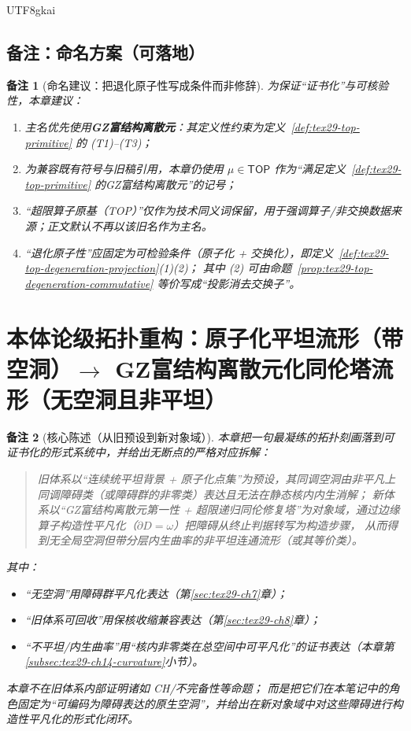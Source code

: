 \documentclass[12pt]{article}
\newtheorem{remark}{备注}[section]
\newcommand{\GZMonFull}{\texorpdfstring{GZ富结构离散元}{GZ富结构离散元}}
\newcommand{\GZMon}{\texorpdfstring{GZ富结构离散元}{GZ富结构离散元}}
\newcommand{\GZMonization}{\texorpdfstring{GZ富结构离散元化}{GZ富结构离散元化}}
\begin{document}
\begin{CJK*}{UTF8}{gkai}
\subsection{备注：命名方案（可落地）}
\label{subsec:tex29-top-remark}

\begin{remark}[命名建议：把退化原子性写成条件而非修辞]
为保证“证书化”与可核验性，本章建议：
\begin{enumerate}
  \item 主名优先使用\textbf{\GZMonFull{}}：其定义性约束为定义~\ref{def:tex29-top-primitive} 的 (T1)--(T3)；
  \item 为兼容既有符号与旧稿引用，本章仍使用 $\mu\in\mathsf{TOP}$ 作为“满足定义~\ref{def:tex29-top-primitive} 的\GZMon{}”的记号；
  \item “超限算子原基（TOP）”仅作为技术同义词保留，用于强调算子/非交换数据来源；正文默认不再以该旧名作为主名。
  \item “退化原子性”应固定为可检验条件（原子化 + 交换化），即定义~\ref{def:tex29-top-degeneration-projection}(1)(2)；
  其中 (2) 可由命题~\ref{prop:tex29-top-degeneration-commutative} 等价写成“投影消去交换子”。
\end{enumerate}
\end{remark}

\clearpage

\section{本体论级拓扑重构：原子化平坦流形（带空洞）\texorpdfstring{$\to$}{->} \GZMonization{}同伦塔流形（无空洞且非平坦）}
\label{sec:tex29-ch14}

\begin{remark}[核心陈述（从旧预设到新对象域）]
本章把一句最凝练的拓扑刻画落到可证书化的形式系统中，并给出无断点的严格对应拆解：
\begin{quote}
旧体系以“连续统平坦背景 + 原子化点集”为预设，其同调空洞由非平凡上同调障碍类（或障碍群的非零类）表达且无法在静态核内内生消解；
新体系以“\GZMon{}第一性 + 超限递归同伦修复塔”为对象域，通过边缘算子构造性平凡化（$\partial D=\omega$）把障碍从终止判据转写为构造步骤，
从而得到无全局空洞但带分层内生曲率的非平坦连通流形（或其等价类）。
\end{quote}
其中：
\begin{itemize}
  \item “无空洞”用障碍群平凡化表达（第\ref{sec:tex29-ch7}章）；
  \item “旧体系可回收”用保核收缩兼容表达（第\ref{sec:tex29-ch8}章）；
  \item “不平坦/内生曲率”用“核内非零类在总空间中可平凡化”的证书表达（本章第\ref{subsec:tex29-ch14-curvature}小节）。
\end{itemize}
本章不在旧体系内部证明诸如 CH/不完备性等命题；
而是把它们在本笔记中的角色固定为“可编码为障碍表达的原生空洞”，并给出在新对象域中对这些障碍进行构造性平凡化的形式化闭环。
\end{remark}


\end{CJK*}
\end{document}
